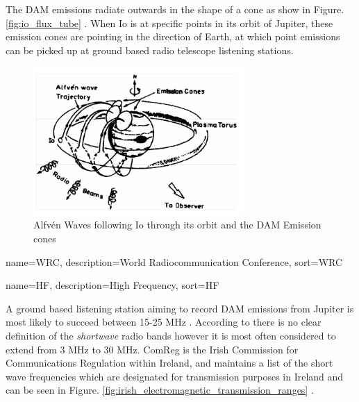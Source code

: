 \documentclass[runningheads,a4paper]{llncs}
\begin{document}
The \gls{DAM} emissions radiate outwards in the shape of a cone as show in Figure. \ref{fig:io_flux_tube} \citep{belcher87}. When Io is at specific points in its orbit of Jupiter, these emission cones are pointing in the direction of Earth, at which point emissions can be picked up at ground based radio telescope listening stations.

%
\begin{figure}[here]
\centering
\includegraphics[width=8cm]{images/04}
\caption{Alfv\'en Waves following Io through its orbit and the DAM Emission cones \citep{bose08}}
\label{fig:io_plasma_torus}
\end{figure}
%

%
%
%

%
{
  name={WRC},
  description={World Radiocommunication Conference},
  sort=WRC
}
%

%
{
  name={HF},
  description={High Frequency},
  sort=HF
}
%

A ground based listening station aiming to record \gls{DAM} emissions from Jupiter is most likely to succeed between 15-25 MHz \citep{wilkinson94}. According to \cite{arrl-00} there is no clear definition of the \textit{shortwave} radio bands however it is most often considered to extend from 3 MHz to 30 MHz. ComReg is the Irish Commission for Communications Regulation within Ireland, and maintains a list of the short wave frequencies which are designated for transmission purposes in Ireland and can be seen in Figure. \ref{fig:irish_electromagnetic_transmission_ranges} \citep{comreg14}.
\end{document}
